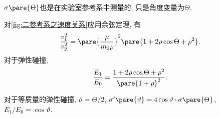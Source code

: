 \documentclass[../TheoreticalMechanics.tex]{subfiles}
\begin{document}
\begin{remark}
    $\sigma\pare{\Theta}$也是在实验室参考系中测量的, 只是角度变量为$\Theta$.
\end{remark}
\begin{lemma}[前后速度关系]
    对\cref{fig:二参考系之速度关系}应用余弦定理, 有
    \[ \frac{v_1^2}{v_2^2} = \pare{\frac{\mu}{m_2\rho}}^2\pare{1+2\rho\cos\Theta+\rho^2}. \]
    对于弹性碰撞,
    \[ \frac{E_1}{E_0} = \frac{1+2\rho\cos\Theta+\rho^2}{\pare{1+\rho}^2}. \]
\end{lemma}
\begin{corollary}[等质量弹性碰撞]
    对于等质量的弹性碰撞, $\vartheta = \Theta/2$, $\sigma'\pare{\vartheta} = 4\cos\vartheta\cdot\sigma\pare{\Theta}$, $E_1/E_0 = \cos\vartheta$.
\end{corollary}



\end{document}
